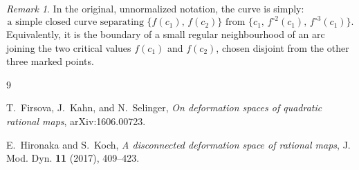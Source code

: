 \documentclass[11pt]{amsart}
\theoremstyle{plain}
\theoremstyle{remark}
\newtheorem{remark}{Remark}
\begin{document}
\begin{remark}
In the original, unnormalized notation, the curve is simply:
\[
\boxed{\text{a simple closed curve separating } \{f(c_1),\,f(c_2)\}
\text{ from } \{c_1,\,f^{\circ 2}(c_1),\,f^{\circ 3}(c_1)\}.}
\]
Equivalently, it is the boundary of a small regular neighbourhood of an arc
joining the two critical values \(f(c_1)\) and \(f(c_2)\), chosen disjoint from
the other three marked points.
\end{remark}

\begin{thebibliography}{9}

T.~Firsova, J.~Kahn, and N.~Selinger,
\emph{On deformation spaces of quadratic rational maps},
arXiv:1606.00723.

E.~Hironaka and S.~Koch,
\emph{A disconnected deformation space of rational maps},
J. Mod. Dyn. \textbf{11} (2017), 409--423.

\end{thebibliography}
\end{document}
